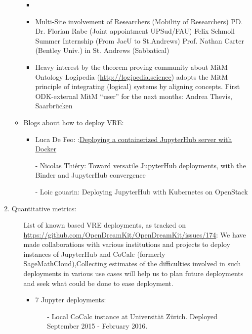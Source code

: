 \begin{enumerate}
\begin{itemize}
\begin{itemize}
\item
\item Multi-Site involvement of Researchers (Mobility of Researchers)
PD. Dr. Florian Rabe (Joint appointment UPSud/FAU)
Felix Schmoll Summer Internship (From JacU to St.Andrews)
Prof. Nathan Carter (Bentley Univ.) in St. Andrews (Sabbatical)
\item Heavy interest by the theorem proving community about MitM Ontology
Logipedia (\url {http://logipedia.science}) adopts the MitM principle of integrating (logical) systems by aligning concepts.
First ODK-external MitM “user” for the next months: Andrea Thevis, Saarbrücken 
\end{itemize}

\item Blogs about how to deploy VRE:
\begin{itemize}
\item Luca De Feo: :\href{https://opendreamkit.org/2018/10/17/jupyterhub-docker/}{Deploying a containerized JupyterHub server with Docker} 
\item[-]Nicolas Thiéry: Toward versatile JupyterHub deployments, with the Binder and JupyterHub convergence %
\item[-]Loic gouarin: Deploying JupyterHub with Kubernetes on OpenStack %
  \end{itemize}
    \end{itemize}
    
\item Quantitative metrics:
\begin{itemize}
\item[List of known \ODK based VRE deployments, as tracked on \url{https://github.com/OpenDreamKit/OpenDreamKit/issues/174}:] We have made 
collaborations with various institutions and projects to deploy instances of JupyterHub and CoCalc (formerly SageMathCloud),Collecting 
estimates of the difficulties involved in such deployments in various use cases will help us to plan future 
deployments and seek what could be done to ease deployment.

\begin{itemize} %
\item 7 Jupyter deployments:%
\begin{itemize}
\item[-]Local CoCalc instance at Universität Zürich. Deployed September 2015 - February 2016.


\end{itemize}
\end{itemize}
\end{itemize}
\end{enumerate}
